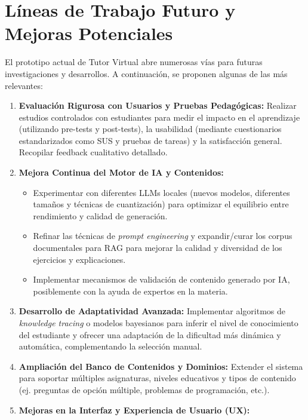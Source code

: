 \section{Líneas de Trabajo Futuro y Mejoras Potenciales}
\label{sec:conclusiones_trabajo_futuro}

El prototipo actual de Tutor Virtual abre numerosas vías para futuras investigaciones y desarrollos. A continuación, se proponen algunas de las más relevantes:

\begin{enumerate}[label=\arabic*., leftmargin=*]
    \item \textbf{Evaluación Rigurosa con Usuarios y Pruebas Pedagógicas:} Realizar estudios controlados con estudiantes para medir el impacto en el aprendizaje (utilizando pre-tests y post-tests), la usabilidad (mediante cuestionarios estandarizados como SUS y pruebas de tareas) y la satisfacción general. Recopilar feedback cualitativo detallado.
    \item \textbf{Mejora Continua del Motor de IA y Contenidos:}
        \begin{itemize}
            \item Experimentar con diferentes LLMs locales (nuevos modelos, diferentes tamaños y técnicas de cuantización) para optimizar el equilibrio entre rendimiento y calidad de generación.
            \item Refinar las técnicas de \emph{prompt engineering} y expandir/curar los corpus documentales para RAG para mejorar la calidad y diversidad de los ejercicios y explicaciones.
            \item Implementar mecanismos de validación de contenido generado por IA, posiblemente con la ayuda de expertos en la materia.
        \end{itemize}
    \item \textbf{Desarrollo de Adaptatividad Avanzada:} Implementar algoritmos de \emph{knowledge tracing} o modelos bayesianos para inferir el nivel de conocimiento del estudiante y ofrecer una adaptación de la dificultad más dinámica y automática, complementando la selección manual.
    \item \textbf{Ampliación del Banco de Contenidos y Dominios:} Extender el sistema para soportar múltiples asignaturas, niveles educativos y tipos de contenido (ej. preguntas de opción múltiple, problemas de programación, etc.).
    \item \textbf{Mejoras en la Interfaz y Experiencia de Usuario (UX):}

\end{enumerate}
